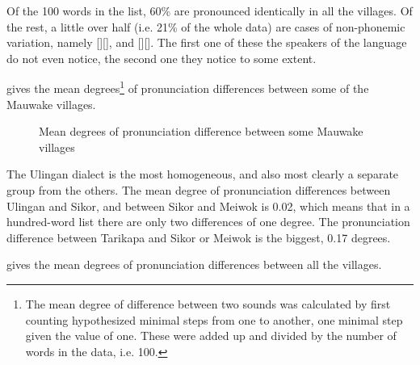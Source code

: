 Of the 100 words in the list, 60\% are pronounced identically in all the villages.  Of the rest, a little over half (i.e. 21\% of the whole data) are cases of non-phonemic variation, namely []{\Tilde}[\emphs{$\beta$}], and []{\Tilde}[\emphs{{\textyogh}}]. The first one of these the speakers of the language do not even notice, the second one they notice to some extent. 

 gives the mean degrees\footnote{The mean degree of difference between two sounds was calculated by first counting hypothesized minimal steps from one to another, one minimal step given the value of one. These were added up and divided by the number of words in the data, i.e. 100.} of pronunciation differences between some of the Mauwake villages. 


\begin{figure}
\caption{Mean degrees of pronunciation difference between some Mauwake villages}
\label{map:5:pronunciationdiff}

\end{figure}


The Ulingan dialect is the most homogeneous, and also most clearly a separate group from the others. The mean degree of pronunciation differences between Ulingan and Sikor, and between Sikor and Meiwok is 0.02, which means that in a hundred-word list there are only two differences of one degree.  The pronunciation difference between Tarikapa and Sikor or Meiwok is the biggest, 0.17 degrees.

 gives the mean degrees of pronunciation differences between all the villages.


